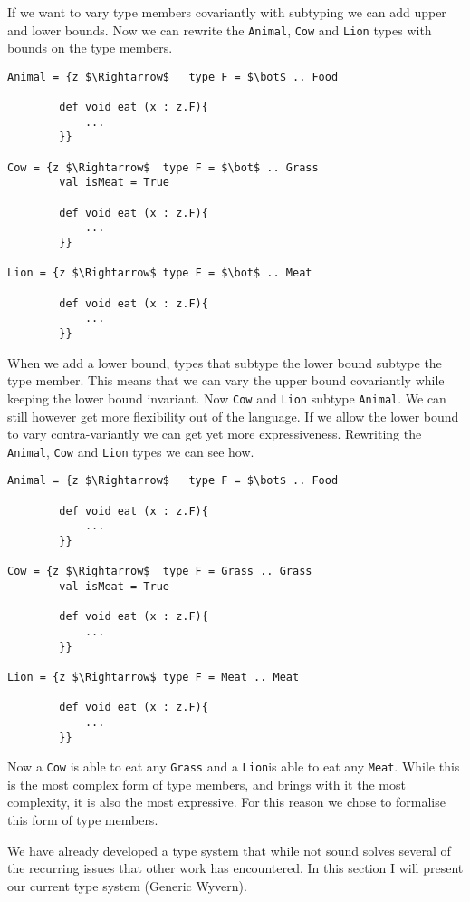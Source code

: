 \documentclass[11pt
              , a4paper
              , twoside
              , openright
              ]{report}
\numberwithin{case}{theorem}
\numberwithin{subcase}{case}
\begin{document}
If we want to vary type members covariantly with subtyping we can add upper and lower bounds. Now we can rewrite the \verb|Animal|, \verb|Cow| and \verb|Lion| types with bounds on the type members.
\begin{lstlisting}[mathescape, style=custom_lang]
Animal = {z $\Rightarrow$	type F = $\bot$ .. Food
		
		def void eat (x : z.F){
			...
		}}
		
Cow = {z $\Rightarrow$	type F = $\bot$ .. Grass
		val isMeat = True
		
		def void eat (x : z.F){
			...
		}}

Lion = {z $\Rightarrow$	type F = $\bot$ .. Meat
		
		def void eat (x : z.F){
			...
		}}
\end{lstlisting}
When we add a lower bound, types that subtype the lower bound subtype the type member. This means that we can vary the upper bound covariantly while keeping the lower bound invariant. Now \verb|Cow| and \verb|Lion| subtype \verb|Animal|. We can still however get more flexibility out of the language. If we allow the lower bound to vary contra-variantly we can get yet more expressiveness. Rewriting the  \verb|Animal|, \verb|Cow| and \verb|Lion| types we can see how.
\begin{lstlisting}[mathescape, style=custom_lang]
Animal = {z $\Rightarrow$	type F = $\bot$ .. Food
		
		def void eat (x : z.F){
			...
		}}
		
Cow = {z $\Rightarrow$	type F = Grass .. Grass
		val isMeat = True
		
		def void eat (x : z.F){
			...
		}}

Lion = {z $\Rightarrow$	type F = Meat .. Meat
		
		def void eat (x : z.F){
			...
		}}
\end{lstlisting}
Now a \verb|Cow| is able to eat any \verb|Grass| and a \verb|Lion|is able to eat any \verb|Meat|. While this is the most complex form of type members, and brings with it the most complexity, it is also the most expressive. For this reason we chose to formalise this form of type members.

We have already developed a type system that while not sound solves several of the recurring issues that other work has encountered. In this section I will present our current type system (Generic Wyvern).
\end{document}

